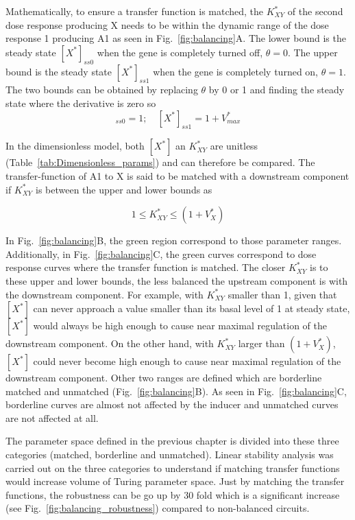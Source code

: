 Mathematically, to ensure a transfer function is matched,
the $K^*_{XY}$ of the second dose response producing X needs
to be within the dynamic range of the dose response 1 producing A1 as seen in Fig.~\ref{fig:balancing}A.
The lower bound is the steady state $[X^*]_{ss0}$ when the gene is completely turned off, $\theta=0$.
The upper bound is the steady state $[X^*]_{ss1}$ when the gene is completely turned on, $\theta=1$.
The two bounds can be obtained
by replacing $\theta$ by 0 or 1 and finding the steady state where the derivative is zero so
\begin{equation}
    [X^*]_{ss0}=1; \quad [X^*]_{ss1}=1+V^*_{max}
    \label{1toVmax}
\end{equation}


In the dimensionless model,
both $[X^*]$ an $K^*_{XY}$ are unitless (Table~\ref{tab:Dimensionless_params}) and can therefore be compared.
The transfer-function of A1 to X is said
to be matched with a downstream component if $K^*_{XY}$ is between the upper and lower bounds as

\begin{equation}
    1 \leq K^*_{XY} \leq (1+V^*_{X})
\end{equation}

In Fig.~\ref{fig:balancing}B, the green region correspond to those parameter ranges.
Additionally, in Fig.~\ref{fig:balancing}C,
the green curves correspond to dose response curves where the transfer function is matched.
The closer $K^*_{XY}$ is to these upper and lower bounds,
the less balanced the upstream component is with the downstream component.
For example, with $K^*_{XY}$ smaller than 1,
given that $[X^*]$ can never approach a value smaller than its basal level of 1 at steady state, $[X^*]$
would always be high enough to cause near maximal regulation of the downstream component.
On the other hand, with $K^*_{XY}$ larger than $(1+V^*_{X})$, $[X^*]$
could never become high enough to cause near maximal regulation of the downstream component.
Other two ranges are defined which are borderline matched and unmatched (Fig.~\ref{fig:balancing}B).
As seen in Fig.~\ref{fig:balancing}C,
borderline curves are almost not affected by the inducer and unmatched curves are not affected at all.

The parameter space defined in the previous chapter is divided into these three categories
(matched, borderline and unmatched).
Linear stability analysis was carried out on the three categories
to understand if matching transfer functions would increase volume of Turing parameter space.
Just by matching the transfer functions,
the robustness can be go up by 30 fold which is a significant increase
(see Fig.~\ref{fig:balancing_robustness}) compared to non-balanced circuits.



